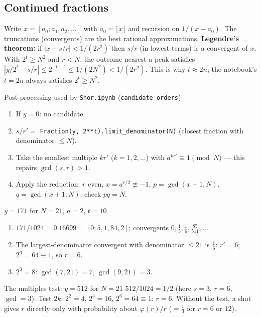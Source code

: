 \documentclass[11pt,a4paper,openany]{book}
\newcounter{wex}[chapter]
\newenvironment{steps}{\begin{enumerate}[label=\textbf{Step \arabic*.}, leftmargin=4.2em, itemsep=2pt]}{\end{enumerate}}
\begin{document}
\subsection{Continued fractions}
Write $x = [a_0; a_1, a_2, \dots]$ with $a_0 = \lfloor x\rfloor$ and recursion on $1/(x - a_0)$. The truncations (convergents) are the best rational approximations.
\textbf{Legendre's theorem:} if $|x - s/r| < 1/(2r^2)$ then $s/r$ (in lowest terms) is a convergent of $x$. With $2^t \ge N^2$ and $r < N$, the outcome nearest a
peak satisfies $|y/2^t - s/r| \le 2^{-t-1} \le 1/(2N^2) < 1/(2r^2)$. This is why $t \approx 2n$; the notebook's $t = 2n$ always satisfies $2^t \ge N^2$.

\begin{method}{Post-processing used by \texttt{Shor.ipynb} (\texttt{candidate\_orders})}
\begin{enumerate}[itemsep=1pt]
\item If $y = 0$: no candidate.
\item $s/r' = $ \texttt{Fraction(y, 2**t).limit\_denominator(N)} (closest fraction with denominator $\le N$).
\item Take the smallest multiple $kr'$ ($k = 1, 2, \dots$) with $a^{kr'} \equiv 1 \pmod N$ --- this repairs $\gcd(s, r) > 1$.
\item Apply the reduction: $r$ even, $x = a^{r/2} \not\equiv -1$, $p = \gcd(x - 1, N)$, $q = \gcd(x + 1, N)$; check $pq = N$.
\end{enumerate}
\end{method}

\begin{wexample}{$y = 171$ for $N = 21$, $a = 2$, $t = 10$}
\begin{steps}
\item $171/1024 = 0.16699 = [0; 5, 1, 84, 2]$; convergents $0, \frac15, \frac16, \frac{85}{511}, \dots$
\item The largest-denominator convergent with denominator $\le 21$ is $\frac16$: $r' = 6$; $2^6 = 64 \equiv 1$, so $r = 6$.
\item $2^3 = 8$: $\gcd(7, 21) = 7$, $\gcd(9, 21) = 3$.
\end{steps}
\end{wexample}

\begin{wexample}{The multiples test: $y = 512$ for $N = 21$}
$512/1024 = 1/2$ (here $s = 3$, $r = 6$, $\gcd = 3$). Test $2k$: $2^2 = 4$, $2^4 = 16$, $2^6 = 64 \equiv 1$: $r = 6$. Without the test, a shot gives $r$ directly only
with probability about $\varphi(r)/r$ ($=\frac13$ for $r = 6$ or $12$).
\end{wexample}
\end{document}
